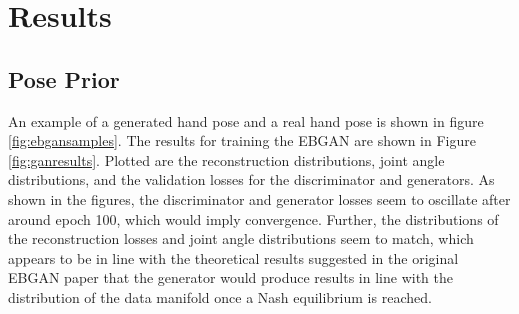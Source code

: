 \documentclass[10pt,twocolumn,letterpaper]{article}
\begin{document}
\section{Results}
\subsection{Pose Prior}
An example of a generated hand pose and a real hand pose is shown in figure \ref{fig:ebgansamples}. The results for training the EBGAN are shown in Figure \ref{fig:ganresults}. Plotted are the reconstruction distributions, joint angle distributions, and the validation losses for the discriminator and generators. As shown in the figures, the discriminator and generator losses seem to oscillate after around epoch 100, which would imply convergence. Further, the distributions of the reconstruction losses and joint angle distributions seem to match, which appears to be in line with the theoretical results suggested in the original EBGAN paper that the generator would produce results in line with the distribution of the data manifold once a Nash equilibrium is reached. 
\end{document}
